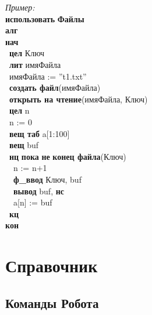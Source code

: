 \documentclass[12pt,a4paper]{article}
\newcommand{\otstup}{\textperiodcentered\ }
\begin{document}
\emph{Пример:}\\
{\sffamily
\textbf{использовать} \textbf{\textcolor{kisp}{Файлы}}\\
\textbf{алг}\\
\textbf{нач}\\
\otstup \textbf{\textcolor{ktype}{цел}} Ключ \\
\otstup \textbf{\textcolor{ktype}{лит}} имяФайла \\
\otstup имяФайла := \textcolor{kvalue}{''t1.txt''}\\
\otstup \textbf{\textcolor{kalg}{создать файл}}(имяФайла)\\ 
\otstup \textbf{\textcolor{kalg}{открыть на чтение}}(имяФайла, Ключ) \\
\otstup \textbf{\textcolor{ktype}{цел}} n \\
\otstup n := \textcolor{kvalue}{0} \\
\otstup \textbf{\textcolor{ktype}{вещ таб}} a[\textcolor{kvalue}{1}:\textcolor{kvalue}{100}]\\
\otstup \textbf{\textcolor{ktype}{вещ}} buf \\
\otstup \textbf{нц} \textbf{пока} \textbf{не} \textbf{\textcolor{kalg}{конец файла}}(Ключ) \\
\otstup \otstup n := n+\textcolor{kvalue}{1}\\
\otstup \otstup \textbf{ф\_ввод} Ключ, buf \\
\otstup \otstup \textbf{вывод} buf, \textbf{нс} \\
\otstup \otstup a[n] := buf \\
\otstup \textbf{кц}\\
\textbf{кон}
}

\section{Справочник}

\subsection{Команды Робота}
\end{document}
